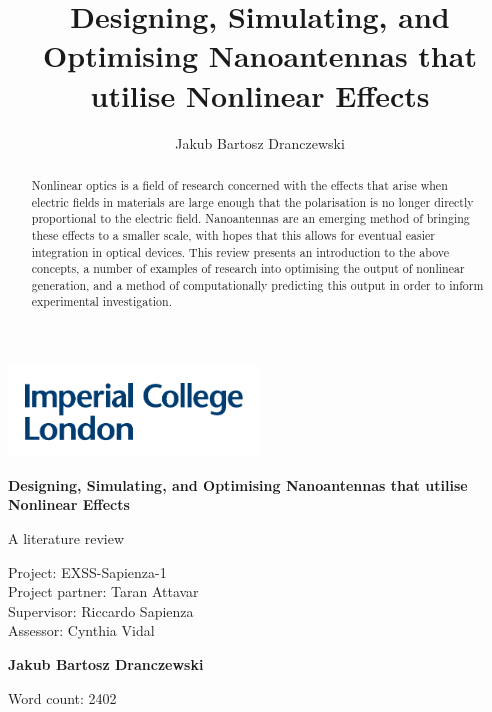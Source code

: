 \documentclass[12pt,a4paper]{article}
\author{Jakub Bartosz Dranczewski}
\title{Designing, Simulating, and Optimising Nanoantennas that utilise Nonlinear Effects}
\date{}
\begin{document}
\begin{titlepage}
	\vspace*{-0.65in}
	\hspace*{-.72in}
	\includegraphics[width=0.5\textwidth]{img/Imperial-logo.pdf}
	\begin{center}
		\vspace*{2cm}
		
		\Huge
		\textbf{Designing, Simulating, and Optimising Nanoantennas that utilise Nonlinear Effects}
		
		\Large
		A literature review
		
		\vspace{1.2cm}
		\large
		Project: EXSS-Sapienza-1\\
		Project partner: Taran Attavar\\
		Supervisor: Riccardo Sapienza\\
		Assessor: Cynthia Vidal
		
		\vspace{1.5cm}
		
		\textbf{Jakub Bartosz Dranczewski}
		
		\vfill
		
		\vspace{0.4cm}
		
		
		Word count: 2402 %
		
	\end{center}
\end{titlepage}

\begin{abstract}
Nonlinear optics is a field of research concerned with the effects that arise when electric fields in materials are large enough that the polarisation is no longer directly proportional to the electric field. Nanoantennas are an emerging method of bringing these effects to a smaller scale, with hopes that this allows for eventual easier integration in optical devices. This review presents an introduction to the above concepts, a number of examples of research into optimising the output of nonlinear generation, and a method of computationally predicting this output in order to inform experimental investigation.
\end{abstract}
\end{document}
